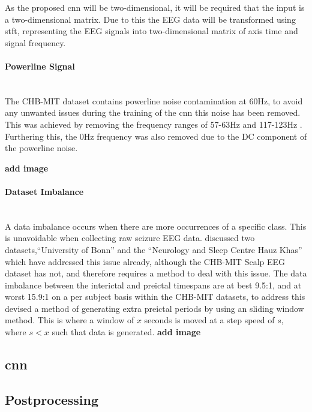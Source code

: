 \documentclass[12pt]{article}
\begin{document}
As the proposed \acrshort{cnn} will be two-dimensional, it will be required that the input is a two-dimensional matrix. Due to this the EEG data will be transformed using \acrshort{stft}, representing the EEG signals into two-dimensional matrix of axis time and signal frequency. 

\paragraph{Powerline Signal} \mbox{}\\

The CHB-MIT dataset contains powerline noise contamination at 60Hz, to avoid any unwanted issues during the training of the \acrshort{cnn} this noise has been removed. This was achieved by removing the frequency ranges of 57-63Hz and 117-123Hz \cite{truong2018convolutional}. Furthering this, the 0Hz frequency was also removed due to the DC component of the powerline noise.

\textbf{add image}

\paragraph{Dataset Imbalance} \mbox{}\\

A data imbalance occurs when there are more occurrences of a specific class. This is unavoidable when collecting raw seizure EEG data. \cite{wong2023eeg} discussed two datasets,``University of Bonn'' and the ``Neurology and Sleep Centre Hauz Khas'' which have addressed this issue already, although the CHB-MIT Scalp EEG dataset has not, and therefore requires a method to deal with this issue. The data imbalance between the interictal and preictal timespans are at best 9.5:1, and at worst 15.9:1 on a per subject basis within the CHB-MIT datasets, to address this \cite{truong2018convolutional} devised a method of generating extra preictal periods by using an sliding window method. This is where a window of $x$ seconds is moved at a step speed of $s$, where $s<x$ such that data is generated. \textbf{add image}

\subsection{\acrfull{cnn}}



\subsection{Postprocessing}
\end{document}
